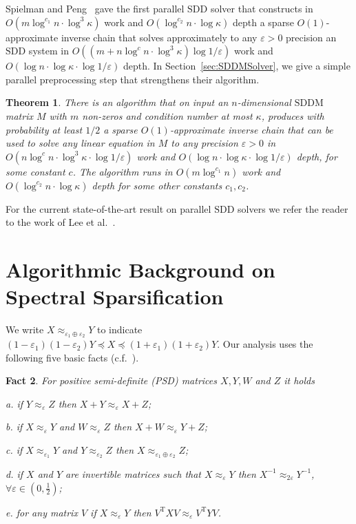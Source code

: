 \documentclass[11pt]{article}
\newcommand{\SDDM}{\mathrm{SDDM}}
\newcommand{\SDD}{\mathrm{SDD}}
\newcommand{\rot}{\mathrm{T}}
\newcommand{\eps}{\epsilon}
\renewcommand{\eps}{\varepsilon}
\newtheorem{thm}{Theorem}  \newtheorem{fact}[thm]{Fact}
\numberwithin{thm}{section}
\begin{document}
Spielman and Peng~\cite{PS14} gave the first parallel $\SDD$ solver that constructs in $O(m\log^{c_1}n\cdot\log^{3}\kappa)$ work and $O(\log^{c_2}n\cdot\log\kappa)$ depth a sparse $O(1)$-approximate inverse chain that solves approximately to any $\eps>0$ precision an $\SDD$ system in $O((m+n \log^{c}n\cdot\log^{3}\kappa)\log1/\eps)$ work and $O(\log n \cdot\log \kappa\cdot\log 1/\eps)$ depth. In Section~\ref{sec:SDDMSolver}, we give a simple parallel preprocessing step that strengthens their algorithm.


\begin{thm}\label{thm_SDDM_Solver}
There is an algorithm that on input an $n$-dimensional $\SDDM$ matrix $M$ with $m$ non-zeros and condition number at most $\kappa$, produces with probability at least $1/2$ a sparse $O(1)$-approximate inverse chain that can be used to solve any linear equation in $M$ to any precision $\eps>0$ in $O(n \log^{c}n\cdot\log^{3}\kappa\cdot\log1/\eps)$ work and $O(\log n \cdot\log \kappa\cdot\log 1/\eps)$ depth, for some constant $c$. The algorithm runs in $O(m\log^{c_1}n)$ work and $O(\log^{c_2}n\cdot\log\kappa)$ depth for some other constants $c_1,c_2$.
\end{thm}

For the current state-of-the-art result on parallel $\SDD$ solvers we refer the reader to the work of Lee et al.~\cite{KLPSS15}.



\section{Algorithmic Background on Spectral Sparsification}\label{sec:BN}

We write $X\approx_{\eps_{1}\oplus\eps_{2}}Y$ to indicate $(1-\eps_{1})(1-\eps_{2})Y\preceq X\preceq(1+\eps_{1})(1+\eps_{2})Y$. Our analysis uses the following five basic facts (c.f.~\cite{ST14,BGHNT06}).

\begin{fact}\label{fact_fiveProps}
For positive semi-definite (PSD) matrices
$X,Y,W$ and $Z$ it holds

a. if $Y\approx_{\eps}Z$ then $X+Y\approx_{\eps}X+Z$;

b. if $X\approx_{\eps}Y$ and $W\approx_{\eps}Z$ then $X+W\approx_{\eps}Y+Z$;

c. if $X\approx_{\eps_{1}}Y$ and $Y\approx_{\eps_{2}}Z$
then $X\approx_{\eps_{1}\oplus\eps_{2}}Z$;

d. if $X$ and $Y$ are invertible matrices such that $X\approx_{\eps}Y$
then $X^{-1}\approx_{2\eps}Y^{-1}$, $\forall \eps\in(0,\frac{1}{2})$;

e. for any matrix $V$ if $X\approx_{\eps}Y$ then $V^{\rot}XV\approx_{\eps}V^{\rot}YV$.
\end{fact}
\end{document}
